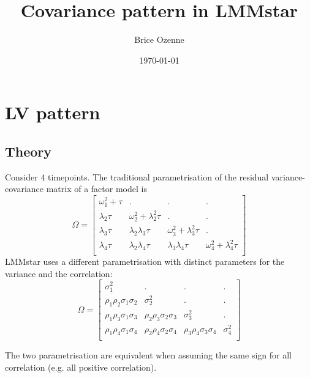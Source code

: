 \documentclass[12pt]{article}
\author{Brice Ozenne}
\date{\today}
\title{Covariance pattern in LMMstar}
\begin{document}
\maketitle

\section{LV pattern}
\label{sec:org6ce11d4}

\subsection{Theory}
\label{sec:org0c9597c}

Consider 4 timepoints. The traditional parametrisation of the residual
variance-covariance matrix of a factor model is
\[ \Omega = \begin{bmatrix}
\omega^2_1 + \tau & .                           & .                           & . \\
\lambda_2 \tau    & \omega^2_2 + \lambda^2_2\tau & .                           & . \\
\lambda_3 \tau    & \lambda_2 \lambda_3 \tau    & \omega^2_3 + \lambda^2_3 \tau & . \\
\lambda_4 \tau    & \lambda_2 \lambda_4 \tau    & \lambda_3 \lambda_4 \tau     & \omega^2_4 + \lambda^2_4 \tau \\
\end{bmatrix} \]
LMMstar uses a different parametrisation with distinct parameters for
the variance and the correlation:
\[ \Omega = \begin{bmatrix}
\sigma^2_1                      & .                              & .                               & . \\
\rho_1 \rho_2 \sigma_1 \sigma_2 & \sigma^2_2                      & .                              & . \\
\rho_1 \rho_3 \sigma_1 \sigma_3 & \rho_2 \rho_3 \sigma_2 \sigma_3 & \sigma^2_3                      & . \\
\rho_1 \rho_4 \sigma_1 \sigma_4 & \rho_2 \rho_4 \sigma_2 \sigma_4 & \rho_3 \rho_4 \sigma_3 \sigma_4 & \sigma^2_4 \\
\end{bmatrix} \]

The two parametrisation are equivalent when assuming the same sign for
all correlation (e.g. all positive correlation).

\bigskip
\end{document}
